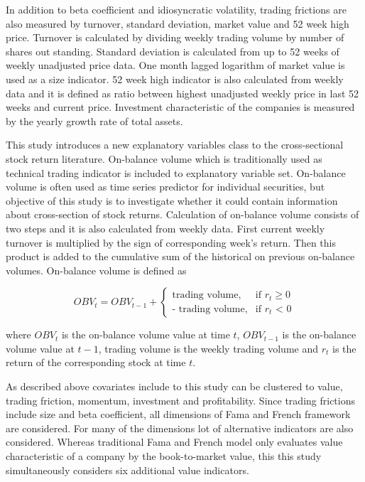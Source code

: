 \documentclass{article}
\begin{document}
In addition to beta coefficient and idiosyncratic volatility, trading frictions are also measured by turnover, standard deviation, market value and 52 week high price. Turnover is calculated by dividing weekly trading volume by number of shares out standing. Standard deviation is calculated from up to 52 weeks of weekly unadjusted price data. One month lagged logarithm of market value is used as a size indicator. 52 week high indicator is also calculated from weekly data and it is defined as ratio between highest unadjusted weekly price in last 52 weeks and current price. Investment characteristic of the companies is measured by the yearly growth rate of total assets. \par

This study introduces a new explanatory variables class to the cross-sectional stock return literature. On-balance volume which is traditionally used as technical trading indicator is included to explanatory variable set. On-balance volume is often used as time series predictor for individual securities, but objective of this study is to investigate whether it could contain information about cross-section of stock returns. Calculation of on-balance volume consists of two steps and it is also calculated from weekly data. First current weekly turnover is multiplied by the sign of corresponding week's return. Then this product is added to the cumulative sum of the historical on previous on-balance volumes. On-balance volume is defined as \par

\begin{equation}
\label{eq:OBV}
OBV_t = OBV_{t-1} + 
\begin{cases}
    \text{trading volume}, 	& \text{if $r_t$} \geq \text{0}\\
    \text{- trading volume},	& \text{if $r_t$ < 0}
\end{cases}
\end{equation}

where $OBV_t$ is the on-balance volume value at time $t$, $OBV_{t-1}$ is the on-balance volume value at $t-1$, trading volume is the weekly trading volume and $r_t$ is the return of the corresponding stock at time $t$. \par

As described above covariates include to this study can be clustered to value, trading friction, momentum, investment and profitability. Since trading frictions include size and beta coefficient, all dimensions of Fama and French framework are considered. For many of the dimensions lot of alternative indicators are also considered. Whereas traditional Fama and French \citeyear{FAMA19933} model only evaluates value characteristic of a company by the book-to-market value, this this study simultaneously considers six additional value indicators. \par
\end{document}
